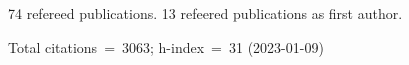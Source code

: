 74 refereed publications. 13 refeered publications as first author.

Total citations~=~3063; h-index~=~31 (2023-01-09)
